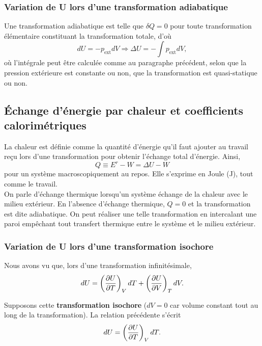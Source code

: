 \documentclass[11pt,a4paper]{report}
\begin{document}
\subsubsection{Variation de U lors d'une transformation adiabatique}

Une transformation adiabatique est telle que $\delta Q = 0$ pour toute transformation élémentaire constituant la transformation totale, d'où
\begin{equation}
	dU = -p_\text{ext}dV \Rightarrow \Delta U = -\int p_\text{ext}dV,
\end{equation}
où l'intégrale peut être calculée comme au paragraphe précédent, selon que la pression extérieure est constante ou non, que la transformation est quasi-statique ou non.

\subsection{\'Echange d'énergie par chaleur et coefficients calorimétriques}

La chaleur est définie comme la quantité d'énergie qu'il faut ajouter au travail reçu lors d'une transformation pour obtenir l'échange total d'énergie. Ainsi,
\begin{equation}
	Q \equiv E^r - W = \Delta U - W
\end{equation}
pour un système macroscopiquement au repos. Elle s'exprime en Joule (J), tout comme le travail.\\

On parle d'échange thermique lorsqu'un système échange de la chaleur avec le milieu extérieur. En l'absence d'échange thermique, $Q = 0$ et la transformation est dite adiabatique. On peut réaliser une telle transformation en intercalant une paroi empêchant tout transfert thermique entre le système et le milieu extérieur.

\subsubsection{Variation de U lors d'une transformation isochore}

Nous avons vu que, lors d'une transformation infinitésimale,
\begin{equation}
	dU = \left(\frac{\partial U}{\partial T}\right)_V dT + \left(\frac{\partial U}{\partial V}\right)_T dV.\\
\end{equation}

Supposons cette \textbf{transformation isochore} ($dV = 0$ car volume constant tout au long de la transformation). La relation précédente s'écrit 
\begin{equation}
	dU = \left(\frac{\partial U}{\partial T}\right)_V dT.\\
\end{equation}
\end{document}
